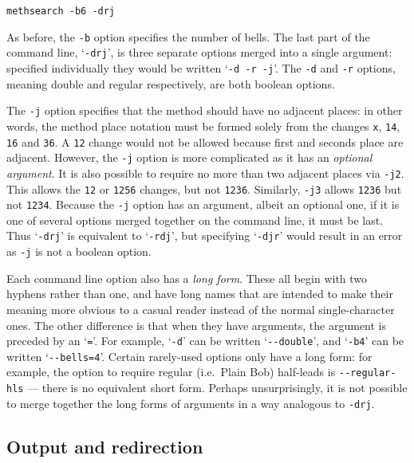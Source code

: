 \documentclass[a4paper,11pt,oneside]{book}
\makeatletter
\newcommand{\oi}[1]{\index{#1@{\hspace*{-\optwidth}\texttt{-}\texttt{#1}}}}
\makeatother
\begin{document}
\begin{Verbatim}
methsearch -b6 -drj
\end{Verbatim}

As before, the \verb+-b+ option specifies the number of bells.  The last
part of the command line, `\verb+-drj+', is three separate options merged
into a single argument: specified individually they would be written 
`\verb+-d -r -j+'.  
The \verb+-d+\oi{d} and \verb+-r+\oi{r} options, meaning double and 
regular respectively, are both boolean options.  

The \verb+-j+ option\oi{j} specifies that the method should have no 
adjacent places: in other words, 
the method place notation must be formed solely from 
the changes \verb+x+, \verb+14+, \verb+16+ and \verb+36+.  
A \verb+12+ change would not be allowed because first and seconds place 
are adjacent.
However, the \verb+-j+ option is more complicated as it has an 
\textit{optional argument}.  
It is also possible to require no more than 
two adjacent places via \verb+-j2+.  
This allows the \verb+12+ or \verb+1256+ changes, but not \verb+1236+.
Similarly, \verb+-j3+ allows \verb+1236+ but not \verb+1234+.  
Because the \verb+-j+ option has an argument, albeit an optional one, 
if it is one of several options merged together on the command line, it 
must be last.  Thus `\verb+-drj+' is equivalent to `\verb+-rdj+', but
specifying `\verb+-djr+' would result in an error as \verb+-j+ is not
a boolean option.

Each command line option also has a 
\textit{long form}.  These all begin
with two hyphens rather than one, and have long names that are intended to 
make their meaning more obvious to a casual reader instead of the 
normal single-character ones.  The other difference is that when they
have arguments, the argument is preceded by an `\verb+=+'.  For example,
`\verb+-d+' can be written `\verb+--double+', 
and `\verb+-b4+' can be written `\verb+--bells=4+'.  
Certain rarely-used options only have a long form: for example,
the option to require regular (i.e.\ Plain Bob) half-leads is 
\verb+--regular-hls+ --- there is no equivalent short form.
Perhaps unsurprisingly, it is not possible to merge together the long forms 
of arguments in a way analogous to \verb+-drj+.


\subsection{Output and redirection}
\label{redirection}
\end{document}
